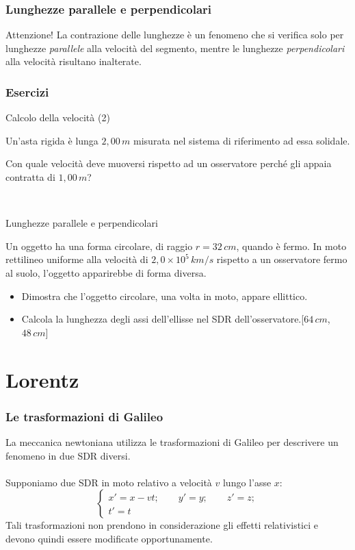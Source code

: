 \documentclass[]{beamer}
\theoremstyle{plain}
\begin{document}
\begin{frame}
  \frametitle{Lunghezze parallele e perpendicolari}
  \begin{alertblock}{Attenzione!}
    La contrazione delle lunghezze è un fenomeno che si verifica solo per lunghezze \emph{parallele} alla velocità del segmento, mentre le lunghezze \emph{perpendicolari} alla velocità risultano inalterate.
  \end{alertblock}
\end{frame}





\begin{frame}
\frametitle{Esercizi}
\begin{exampleblock}{Calcolo della velocità (2)}
\small{
  Un'asta rigida è lunga $ 2,00 \, m $ misurata nel sistema di riferimento ad essa solidale.

Con quale velocità deve muoversi rispetto ad un osservatore perché gli appaia contratta di $ 1,00 \, m $?
  }
\end{exampleblock}

~

\begin{exampleblock}{Lunghezze parallele e perpendicolari}
\small{
  Un oggetto ha una forma circolare, di raggio $ r = 32 \, cm $, quando è fermo. In moto rettilineo uniforme alla velocità di $ 2,0 \times 10^{5} \, km/s $ rispetto a un osservatore fermo al suolo, l'oggetto apparirebbe di forma diversa.
  \begin{itemize}
    \item Dimostra che l'oggetto circolare, una volta in moto, appare ellittico.
    \item Calcola la lunghezza degli assi dell'ellisse nel SDR dell'osservatore.\hspace*{\fill}[$ 64 \, cm $, $ 48 \, cm $]
  \end{itemize}
  }
\end{exampleblock}
\end{frame}




\section{Lorentz}
\begin{frame}
  \frametitle{Le trasformazioni di Galileo}
  La meccanica newtoniana utilizza le trasformazioni di Galileo per descrivere un fenomeno in due SDR diversi.\\~\pause\\    
  Supponiamo due SDR in moto relativo a velocità $ v $ lungo l'asse $ x $:
    \[
  \left\{ 
  \begin{array}{l}
  x' = x - vt; \quad\quad y' = y; \quad\quad z' = z;\\
  t' = t
  \end{array}
  \right. 
  \]\pause
  Tali trasformazioni non prendono in considerazione gli effetti relativistici e devono quindi essere modificate opportunamente.
\end{frame}
\end{document}
